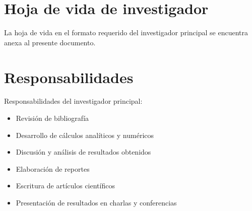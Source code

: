 \documentclass[a4paper,10pt]{article}
\begin{document}
\section{Hoja de vida de investigador}

La hoja de vida en el formato requerido del investigador principal se encuentra anexa al presente documento.

\section{Responsabilidades}

Responsabilidades del investigador principal:

\begin{itemize}
\item Revisi\'on de bibliograf\'{i}a
\item Desarrollo de c\'alculos anal\'{i}ticos y num\'ericos
\item Discusi\'on y an\'alisis de resultados obtenidos
\item Elaboraci\'on de reportes
\item Escritura de art\'{i}culos cient\'{i}ficos
\item Presentaci\'on de resultados en charlas y conferencias
\end{itemize}

%




\end{document}
